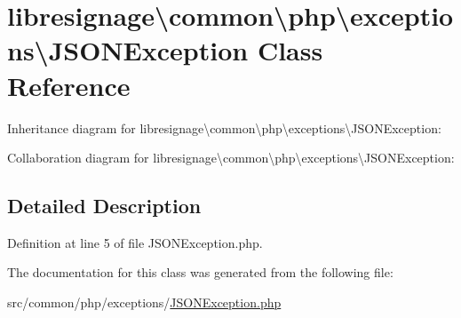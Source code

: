 \hypertarget{classlibresignage_1_1common_1_1php_1_1exceptions_1_1JSONException}{}\section{libresignage\textbackslash{}common\textbackslash{}php\textbackslash{}exceptions\textbackslash{}J\+S\+O\+N\+Exception Class Reference}
\label{classlibresignage_1_1common_1_1php_1_1exceptions_1_1JSONException}


Inheritance diagram for libresignage\textbackslash{}common\textbackslash{}php\textbackslash{}exceptions\textbackslash{}J\+S\+O\+N\+Exception\+:


Collaboration diagram for libresignage\textbackslash{}common\textbackslash{}php\textbackslash{}exceptions\textbackslash{}J\+S\+O\+N\+Exception\+:


\subsection{Detailed Description}


Definition at line 5 of file J\+S\+O\+N\+Exception.\+php.



The documentation for this class was generated from the following file\+:\begin{DoxyCompactItemize}
\item 
src/common/php/exceptions/\hyperlink{JSONException_8php}{J\+S\+O\+N\+Exception.\+php}\end{DoxyCompactItemize}
